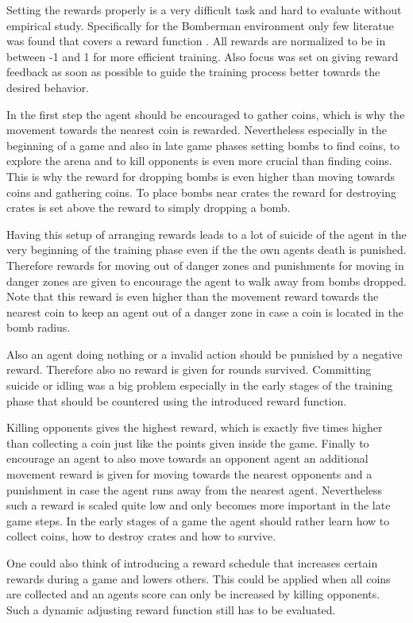 Setting the rewards properly is a very difficult task and hard to evaluate without empirical study. Specifically for the Bomberman environment only few literatue was found that covers a reward function \cite{Kormelink2018, Franca2019}. All rewards are normalized to be in between -1 and 1 for more efficient training. Also focus was set on giving reward feedback as soon as possible to guide the training process better towards the desired behavior. 

In the first step the agent should be encouraged to gather coins, which is why the movement towards the nearest coin is rewarded. Nevertheless especially in the beginning of a game and also in late game phases setting bombs to find coins, to explore the arena and to kill opponents is even more crucial than finding coins. This is why the reward for dropping bombs is even higher than moving towards coins and gathering coins. To place bombs near crates the reward for destroying crates is set above the reward to simply dropping a bomb. 

Having this setup of arranging rewards leads to a lot of suicide of the agent in the very beginning of the training phase even if the the own agents death is punished. Therefore rewards for moving out of danger zones and punishments for moving in danger zones are given to encourage the agent to walk away from bombs dropped. Note that this reward is even higher than the movement reward towards the nearest coin to keep an agent out of a danger zone in case a coin is located in the bomb radius. 

Also an agent doing nothing or a invalid action should be punished by a negative reward. Therefore also no reward is given for rounds survived. Committing suicide or idling was a big problem especially in the early stages of the training phase that should be countered using the introduced reward function. 

Killing opponents gives the highest reward, which is exactly five times higher than collecting a coin just like the points given inside the game. Finally to encourage an agent to also move towards an opponent agent an additional movement reward is given for moving towards the nearest opponents and a punishment in case the agent runs away from the nearest agent. Nevertheless such a reward is scaled quite low and only becomes more important in the late game steps. In the early stages of a game the agent should rather learn how to collect coins, how to destroy crates and how to survive. 

One could also think of introducing a reward schedule that increases certain rewards during a game and lowers others. This could be applied when all coins are collected and an agents score can only be increased by killing opponents. Such a dynamic adjusting reward function still has to be evaluated.

